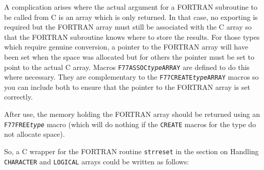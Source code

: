 \documentclass[twoside,11pt]{article}
\newcommand{\htmlref}[2]{#1}
\renewcommand{\_}{\texttt{\symbol{95}}}
\begin{document}
A complication arises where the actual argument for a FORTRAN subroutine to be
called from C is an array which is only returned. 
In that case, no exporting is
required but the FORTRAN array must still be associated with the C array so
that the FORTRAN subroutine knows where to store the results.
For those types which require genuine conversion, a pointer to the FORTRAN 
array will have been set when the space was allocated but for others the
pointer must be set to point to the actual C array.
Macros 
\htmlref{\texttt{F77\_\-ASSOC\_\-\textit{type}\_\-ARRAY}}
{F77_ASSOC_type_ARRAY}
are defined to do this where necessary. 
They are complementary to the
\htmlref{\texttt{F77\_\-CREATE\_\-\textit{type}\_\-ARRAY}}
{F77_CREATE_type_ARRAY}
macros so you can include both to ensure that the pointer to the FORTRAN array
is set correctly.

After use, the memory holding the FORTRAN array should be returned using an
\htmlref{\texttt{F77\_\-FREE\_\-\textit{type}}}{F77_FREE_type}
macro (which will do nothing if the \texttt{CREATE} macros for the type do not
allocate space).

So, a C wrapper for the FORTRAN routine \texttt{str\_reset} in the section on
\htmlref{Handling \texttt{CHARACTER} and \texttt{LOGICAL} arrays}{char_arrays}
could be written as follows:
\end{document}
